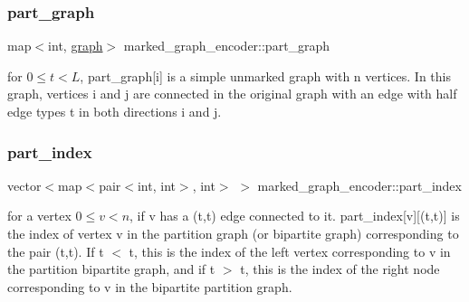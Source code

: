 \mbox{\label{classmarked__graph__encoder_adbafd0769ae301acc1b2c19b5e1d4844}} 
\subsubsection{\texorpdfstring{part\+\_\+graph}{part\_graph}}
{\footnotesize\ttfamily map$<$int, \hyperlink{classgraph}{graph}$>$ marked\+\_\+graph\+\_\+encoder\+::part\+\_\+graph\hspace{0.3cm}{\ttfamily [private]}}



for $0 \leq t < L$, part\+\_\+graph\mbox{[}i\mbox{]} is a simple unmarked graph with n vertices. In this graph, vertices i and j are connected in the original graph with an edge with half edge types t in both directions i and j. 

\mbox{\label{classmarked__graph__encoder_a1d3e2b90f5d46244fd4cb33c69ac81f1}} 
\subsubsection{\texorpdfstring{part\+\_\+index}{part\_index}}
{\footnotesize\ttfamily vector$<$map$<$pair$<$int, int$>$, int$>$ $>$ marked\+\_\+graph\+\_\+encoder\+::part\+\_\+index\hspace{0.3cm}{\ttfamily [private]}}



for a vertex $0 \leq v < n$, if v has a (t,t\textquotesingle{}) edge connected to it. part\+\_\+index\mbox{[}v\mbox{]}\mbox{[}(t,t\textquotesingle{})\mbox{]} is the index of vertex v in the partition graph (or bipartite graph) corresponding to the pair (t,t\textquotesingle{}). If t $<$ t\textquotesingle{}, this is the index of the left vertex corresponding to v in the partition bipartite graph, and if t $>$ t\textquotesingle{}, this is the index of the right node corresponding to v in the bipartite partition graph. 

\mbox{\label{classmarked__graph__encoder_a08fdf6fcd7dcd8c5d1667f2d7ff06c2c}} 
